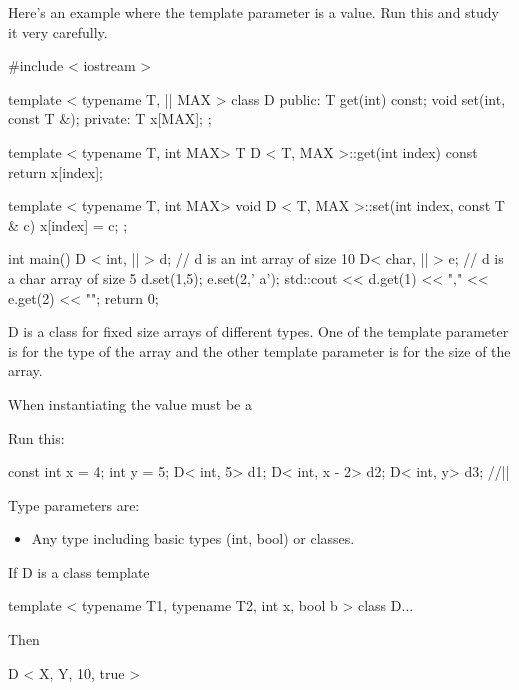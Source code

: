 Here's an example where the template parameter is a value. Run this and
study it very carefully.

\begin{consolethree}[escapeinside=||]
#include < iostream >

template < typename T, || MAX >
class D
{
public:
     T get(int) const;
     void set(int, const T &);
private:
     T x[MAX];
};

template < typename T, int MAX>
T D < T, MAX >::get(int index) const
{    
     return x[index];
}

template < typename T, int MAX>
void D < T, MAX >::set(int index, const T & c)
{    
     x[index] = c;
};

int main()
{   
     D < int, || > d; // d is an int array of size 10
     D< char, || > e; // d is a char array of size 5
     d.set(1,5);
     e.set(2,' a');
     std::cout << d.get(1) << ","
               << e.get(2) << "\n";
     return 0;
}
 
\end{consolethree}

D is a class for fixed size arrays of different types. One of the template parameter is for the type of the array and the other template parameter is for the size of the array.

When instantiating the value must be a 

Run this:

\begin{consolethree}[escapeinside=||]
const int x = 4;
int y = 5;
D< int, 5> d1;
D< int, x - 2> d2;
D< int, y> d3; //||
\end{consolethree}

Type parameters are:

\begin{itemize}
\item
  Any type including basic types (int, bool) or classes.
\end{itemize}

If D is a class template

\begin{console}
template < typename T1, typename T2,
         int x, bool b >
class D{...} 
\end{console}

Then

\begin{console}
D < X, Y, 10, true > 
\end{console}

